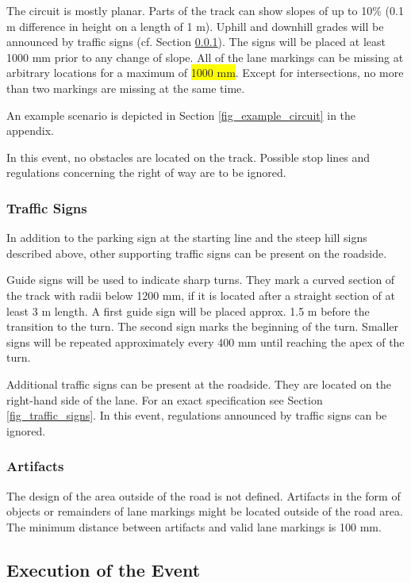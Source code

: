 \documentclass[a4paper]{report}
\begin{document}
The circuit is mostly planar. Parts of the track can show slopes of up to 10\%
(0.1 m difference in height on a length of 1 m). Uphill and downhill grades
will be announced by traffic signs (cf. Section \ref{traffic_signs}). The signs
will be placed at least 1000 mm prior to any change of slope. All of the lane
markings can be missing at arbitrary locations for a maximum of
\colorbox{yellow}{1000 mm}. Except for intersections, no more than two markings
are missing at the same time.

An example scenario is depicted in Section \ref{fig_example_circuit} in the
appendix.

In this event, no obstacles are located on the track. Possible stop lines and
regulations concerning the right of way are to be ignored.

\subsubsection{Traffic Signs}
\label{traffic_signs}

In addition to the parking sign at the starting line and the steep hill signs
described above, other supporting traffic signs can be present on the roadside.

Guide signs will be used to indicate sharp turns. They mark a curved section of
the track with radii below 1200 mm, if it is located after a straight section
of at least 3 m length. A first guide sign will be placed approx. 1.5 m before
the transition to the turn. The second sign marks the beginning of the turn.
Smaller signs will be repeated approximately every 400 mm until reaching the
apex of the turn.

Additional traffic signs can be present at the roadside. They are located on
the right-hand side of the lane. For an exact specification see Section
\ref{fig_traffic_signs}. In this event, regulations announced by traffic signs
can be ignored.

\subsubsection{Artifacts}
\label{artifacts}

The design of the area outside of the road is not defined. Artifacts in the
form of objects or remainders of lane markings might be located outside of the
road area. The minimum distance between artifacts and valid lane markings is
100 mm.

\subsection{Execution of the Event}
\end{document}
